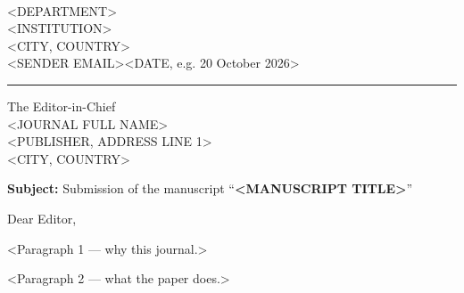 \documentclass[11pt,a4paper]{article}
\begin{document}
\\[2pt]
{\small <DEPARTMENT>\\
<INSTITUTION>\\
<CITY, COUNTRY>\\[2pt]
<SENDER EMAIL>}\hfill{\small <DATE, e.g. 20 October 2026>}

\nointerlineskip\vspace{-\parskip}\vspace{6pt}%
\noindent\textcolor{accent}{\rule{\linewidth}{0.8pt}}

\vspace{1em}
\noindent
The Editor-in-Chief\\
\textsc{<JOURNAL FULL NAME>}\\
<PUBLISHER, ADDRESS LINE 1>\\
<CITY, COUNTRY>

\vspace{1.2em}
\noindent\textbf{Subject:} Submission of the manuscript ``\textbf{<MANUSCRIPT TITLE>}''

\vspace{1em}
\noindent Dear Editor,

<Paragraph 1 — why this journal.>

<Paragraph 2 — what the paper does.>
\end{document}
